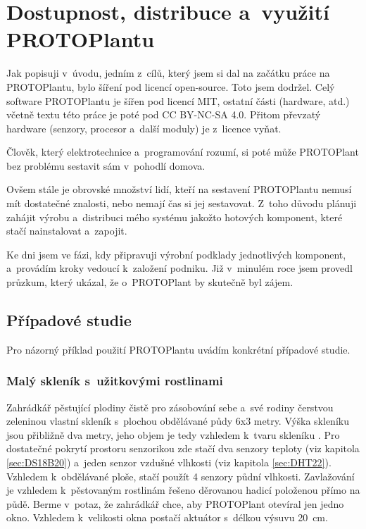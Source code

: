 \chapter{Dostupnost, distribuce a~využití PROTOPlantu}
\label{sec:DISTRIBUTION}
Jak popisuji v~úvodu, jedním z~cílů, který jsem si dal na začátku práce na PROTOPlantu, bylo šíření pod licencí open-source.
Toto jsem dodržel. 
Celý software PROTOPlantu je šířen pod licencí MIT, ostatní části (hardware, atd.) včetně textu této práce je poté pod CC BY-NC-SA 4.0.
Přitom převzatý hardware (senzory, procesor a~další moduly) je z~licence vyňat.

Člověk, který elektrotechnice a~programování rozumí, si poté může PROTOPlant bez problému sestavit sám v~pohodlí domova.

Ovšem stále je obrovské množství lidí, kteří na sestavení PROTOPlantu nemusí mít dostatečné znalosti, nebo nemají čas si jej sestavovat.
Z~toho důvodu plánuji zahájit výrobu a~distribuci mého systému jakožto hotových komponent, které stačí nainstalovat a~zapojit.

Ke dni  jsem ve fázi, kdy připravuji výrobní podklady jednotlivých komponent, a~provádím kroky vedoucí k~založení podniku.
Již v~minulém roce jsem provedl průzkum, který ukázal, že o~PROTOPlant by skutečně byl zájem.

\section{Případové studie}
Pro názorný příklad použití PROTOPlantu uvádím konkrétní případové studie.

\subsection{Malý skleník s~užitkovými rostlinami}
Zahrádkář pěstující plodiny čistě pro zásobování sebe a~své rodiny čerstvou zeleninou vlastní skleník s~plochou obdělávané půdy 6x3 metry.
Výška skleníku jsou přibližně dva metry, jeho objem je tedy vzhledem k~tvaru skleníku .
Pro dostatečné pokrytí prostoru senzorikou zde stačí dva senzory teploty (viz kapitola \ref{sec:DS18B20}) a~jeden senzor vzdušné vlhkosti (viz kapitola \ref{sec:DHT22}). 
Vzhledem k~obdělávané ploše, stačí použít 4 senzory půdní vlhkosti.
Zavlažování je vzhledem k~pěstovaným rostlinám řešeno děrovanou hadicí položenou přímo na půdě.
Berme v~potaz, že zahrádkář chce, aby PROTOPlant otevíral jen jedno okno.
Vzhledem k~velikosti okna postačí aktuátor s~délkou výsuvu 20~cm.

